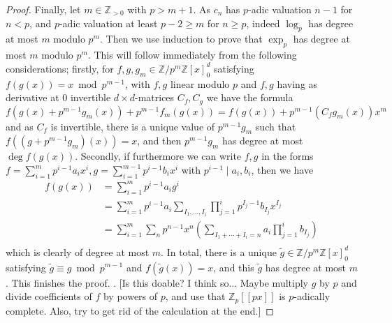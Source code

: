 \documentclass[12pt]{article}
\newcommand{\Z}{\mathbb{Z}}
\theoremstyle{plain}
\theoremstyle{definition}
\theoremstyle{remark}
\begin{document}
\begin{proof}
Finally, let $m \in \Z_{>0}$ with $p > m+1$. As $c_n$ has $p$-adic valuation $n-1$ for $n < p$, and $p$-adic valuation at least $p-2 \geq m$ for $n \geq p$, indeed $\log_p$ has degree at most $m$ modulo $p^m$. Then we use induction to prove that $\exp_p$ has degree at most $m$ modulo $p^m$. This will follow immediately from the following considerations; firstly, for $f,g,g_m \in \Z/p^m\Z[x]_0^d$ satisfying $f(g(x)) = x \bmod p^{m-1}$, with $f,g$ linear modulo $p$ and $f,g$ having as derivative at $0$ invertible $d\times d$-matrices $C_f,C_g$ we have the formula
\[
f(g(x) + p^{m-1}g_m(x))+p^{m-1}f_m(g(x)) = f(g(x)) + p^{m-1}(C_f g_m(x))x^m
\]
and as $C_f$ is invertible, there is a unique value of $p^{m-1}g_m$ such that $f((g+p^{m-1}g_m)(x)) = x$, and then $p^{m-1}g_m$ has degree at most $\deg f(g(x))$. Secondly, if furthermore we can write $f,g$ in the forms $f = \sum_{i=1}^m p^{i-1}a_i x^i,g = \sum_{i=1}^{m-1} p^{i-1}b_i x^i$ with $p^{i-1}\mid a_i,b_i$, then we have
\begin{align*}
f(g(x)) &= \sum_{i=1}^m p^{i-1} a_i g^i \\
        &= \sum_{i=1}^m p^{i-1} a_i \sum_{I_1,\dots,I_{i}} \prod_{j=1}^i p^{I_j-1} b_{I_j} x^{I_j} \\
        &= \sum_{i=1}^m \sum_n p^{n-1} x^n \left(\sum_{I_1 + \cdots +I_{i} = n} a_i \prod_{j=1}^i b_{I_j}\right) \\
\end{align*}
which is clearly of degree at most $m$. In total, there is a unique $\tilde{g} \in \Z/p^m\Z[x]_0^d$ satisfying $\tilde{g} \equiv g \bmod p^{m-1}$ and $f(\tilde{g}(x))=x$, and this $\tilde{g}$ has degree at most $m$. This finishes the proof.
. [Is this doable? I think so... Maybe multiply $g$ by $p$ and divide coefficients of $f$ by powers of $p$, and use that $\Z_p[[px]]$ is $p$-adically complete. Also, try to get rid of the calculation at the end.]
\end{proof}
\end{document}
